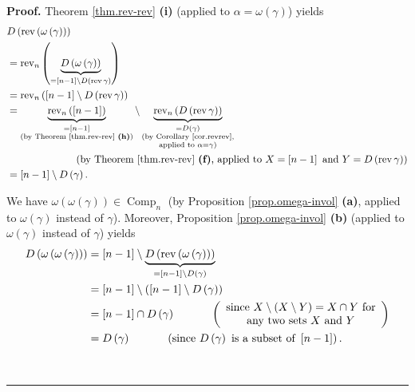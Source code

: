 \documentclass[numbers=enddot,12pt,final,onecolumn,notitlepage]{scrartcl}%
\theoremstyle{definition}
\newenvironment{proof}[1][Proof]{\noindent\textbf{#1.} }{\ \rule{0.5em}{0.5em}}
\begin{document}
\begin{proof}
Theorem \ref{thm.rev-rev} \textbf{(i)} (applied to $\alpha=\omega\left(
\gamma\right)  $) yields%
\begin{align*}
&  D\left(  \operatorname*{rev}\left(  \omega\left(  \gamma\right)  \right)
\right) \\
&  =\operatorname*{rev}\nolimits_{n}\left(  \underbrace{D\left(  \omega\left(
\gamma\right)  \right)  }_{=\left[  n-1\right]  \setminus D\left(
\operatorname*{rev}\gamma\right)  }\right) \\
&  =\operatorname*{rev}\nolimits_{n}\left(  \left[  n-1\right]  \setminus
D\left(  \operatorname*{rev}\gamma\right)  \right) \\
&  =\underbrace{\operatorname*{rev}\nolimits_{n}\left(  \left[  n-1\right]
\right)  }_{\substack{=\left[  n-1\right]  \\\text{(by Theorem
\ref{thm.rev-rev} \textbf{(h)})}}}\setminus\underbrace{\operatorname*{rev}%
\nolimits_{n}\left(  D\left(  \operatorname*{rev}\gamma\right)  \right)
}_{\substack{=D\left(  \gamma\right)  \\\text{(by Corollary \ref{cor.revrev}%
,}\\\text{applied to }\alpha=\gamma\text{)}}}\\
&  \ \ \ \ \ \ \ \ \ \ \ \ \ \ \ \ \ \ \ \ \left(  \text{by Theorem
\ref{thm.rev-rev} \textbf{(f)}, applied to }X=\left[  n-1\right]  \text{ and
}Y=D\left(  \operatorname*{rev}\gamma\right)  \right) \\
&  =\left[  n-1\right]  \setminus D\left(  \gamma\right)  .
\end{align*}


We have $\omega\left(  \omega\left(  \gamma\right)  \right)  \in
\operatorname*{Comp}\nolimits_{n}$ (by Proposition \ref{prop.omega-invol}
\textbf{(a)}, applied to $\omega\left(  \gamma\right)  $ instead of $\gamma$).
Moreover, Proposition \ref{prop.omega-invol} \textbf{(b)} (applied to
$\omega\left(  \gamma\right)  $ instead of $\gamma$) yields%
\begin{align*}
D\left(  \omega\left(  \omega\left(  \gamma\right)  \right)  \right)   &
=\left[  n-1\right]  \setminus\underbrace{D\left(  \operatorname*{rev}\left(
\omega\left(  \gamma\right)  \right)  \right)  }_{=\left[  n-1\right]
\setminus D\left(  \gamma\right)  }\\
&  =\left[  n-1\right]  \setminus\left(  \left[  n-1\right]  \setminus
D\left(  \gamma\right)  \right) \\
&  =\left[  n-1\right]  \cap D\left(  \gamma\right)
\ \ \ \ \ \ \ \ \ \ \left(
\begin{array}
[c]{c}%
\text{since }X\setminus\left(  X\setminus Y\right)  =X\cap Y\text{ for}\\
\text{any two sets }X\text{ and }Y
\end{array}
\right) \\
&  =D\left(  \gamma\right)  \ \ \ \ \ \ \ \ \ \ \left(  \text{since }D\left(
\gamma\right)  \text{ is a subset of }\left[  n-1\right]  \right)  .
\end{align*}



\end{proof}
\end{document}
